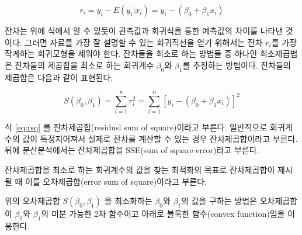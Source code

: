 \documentclass[
]{book}
\makeatletter
\newenvironment{kframe}{%
\medskip{}
\setlength{\fboxsep}{.8em}
 \def\at@end@of@kframe{}%
 \ifinner\ifhmode%
  \def\at@end@of@kframe{\end{minipage}}%
  \begin{minipage}{\columnwidth}%
 \fi\fi%
 \def\FrameCommand##1{\hskip\@totalleftmargin \hskip-\fboxsep
 \colorbox{shadecolor}{##1}\hskip-\fboxsep
     \hskip-\linewidth \hskip-\@totalleftmargin \hskip\columnwidth}%
 \MakeFramed {\advance\hsize-\width
   \@totalleftmargin\z@ \linewidth\hsize
   \@setminipage}}%
 {\par\unskip\endMakeFramed%
 \at@end@of@kframe}
\newenvironment{rmdblock}[1]
  {
  \begin{itemize}
  \renewcommand{\labelitemi}{
    \raisebox{-.7\height}[0pt][0pt]{
      {\setkeys{Gin}{width=3em,keepaspectratio}\texttt{[image: images/\#1]}}
    }
  }
  \setlength{\fboxsep}{1em}
  \begin{kframe}
  \item
  }
  {
  \end{kframe}
  \end{itemize}
  }
\newenvironment{rmdnote}
  {\begin{rmdblock}{note}}
  {\end{rmdblock}}
\theoremstyle{definition}
\theoremstyle{definition}
\theoremstyle{definition}
\theoremstyle{remark}
\makeatother
\begin{document}
\[  r_i = y_i - E(y_i|x_i) = y_i - (  \beta_0 +  \beta_1 x_i) \]

잔차는 위에 식에서 알 수 있듯이 관측값과 회귀식을 통한 예측값의 차이를
나타낸 것이다. 그러면 자료를 가장 잘 설명할 수 있는 회귀직선을 얻기
위해서는 잔차 \(r_i\)를 가장 작게하는 회귀모형을 세워야 한다. 잔차들을
최소로 하는 방법들 중 하나인 최소제곱법은 잔차들의 제곱합을 최소로 하는
회귀계수 \(\beta_0\)와 \(\beta_1\)를 추정하는 방법이다. 잔차들의 제곱합은
다음과 같이 표현된다.

\begin{equation} 
 S(\beta_0 , \beta_1) = \sum^n_{i=1}r^2_i = \sum^n_{i=1}[y_i-(\beta_0 + \beta_1 x_i)]^2 
 \label{eq:rsq}
 \end{equation}

\begin{rmdnote}
식 \eqref{eq:rsq} 를 잔차제곱합(residusl sum of square)이라고 부른다. 일반적으로 회귀계수의 값이 특정지어져서 실제로 잔차를 계산할 수 있는 경우 잔차제곱합이라고 부른다. 뒤에 분산분석에서는 잔차제곱합을 SSE(sum of square error)라고 부른다.

잔차제곱합을 최소로 하는 회귀계수의 값을 찾는 최적화의 목표로 잔차제곱합이 제시될 때 이를 오차제곱합(error sum of square)이라고 부른다.
\end{rmdnote}

위의 오차제곱합 \(S(\beta_0 , \beta_1)\) 을 최소화하는 \(\beta_0\)와
\(\beta_1\)의 값을 구하는 방법은 오차제곱합이 \(\beta_0\)와 \(\beta_1\)의 미분
가능한 2차 함수이고 아래로 볼록한 함수(convex function)임을 이용한다.
\end{document}
